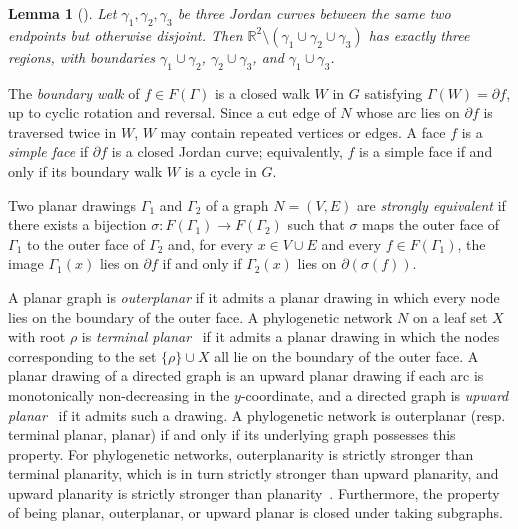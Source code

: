 \documentclass[pdflatex,sn-mathphys-num]{sn-jnl}
\theoremstyle{thmstyleone}%
\theoremstyle{thmstyletwo}%
\newtheorem{lemma}{Lemma}
\theoremstyle{thmstylethree}%
\begin{document}
\begin{lemma}[{\cite[Lemma~4.1.2(i)]{Diestel}}]\label{lmm:diestel-412}
Let $\gamma_1, \gamma_2, \gamma_3$ be three Jordan curves between the same two endpoints but otherwise disjoint. Then $\mathbb{R}^2\setminus (\gamma_1\cup \gamma_2 \cup \gamma_3)$ has exactly three regions, with boundaries $\gamma_1\cup \gamma_2$, $\gamma_2\cup \gamma_3$, and $\gamma_1\cup \gamma_3$.
\end{lemma}

The \emph{boundary walk} of $f \in F(\Gamma)$ is a closed walk $W$ in $G$ satisfying $\Gamma(W) = \partial f$, up to cyclic rotation and reversal. Since a cut edge of $N$ whose arc lies on $\partial f$ is traversed twice in $W$, $W$ may contain repeated vertices or edges. A face $f$ is a \emph{simple face} if $\partial f$ is a closed Jordan curve; equivalently, $f$ is a simple face if and only if its boundary walk $W$ is a cycle in $G$.

Two planar drawings $\Gamma_1$ and $\Gamma_2$ of a graph $N=(V,E)$ are \emph{strongly equivalent} if there exists a bijection $\sigma:F(\Gamma_1)\to F(\Gamma_2)$ such that $\sigma$ maps the outer face
of $\Gamma_1$ to the outer face of $\Gamma_2$ and, for every $x\in V\cup E$ and every $f\in F(\Gamma_1)$, the image $\Gamma_1(x)$ lies on $\partial f$ if and only if $\Gamma_2(x)$ lies on $\partial(\sigma(f))$.


A planar graph is \emph{outerplanar} if it admits a planar drawing in which every node lies on the boundary of the outer face. A phylogenetic network $N$ on a leaf set $X$ with root $\rho$ is \emph{terminal planar}~\cite{MoultonWu2022} if it admits a planar drawing in which the nodes corresponding to the set $\{\rho\} \cup X$ all lie on the boundary of the outer face. A planar drawing of a directed graph is an upward planar drawing if each arc is monotonically non-decreasing in the $y$-coordinate, and a directed graph is \emph{upward planar}~\cite{Thomassen1989} if it admits such a drawing. A phylogenetic network is outerplanar (resp. terminal planar, planar) if and only if its underlying graph possesses this property.
For phylogenetic networks, outerplanarity is strictly stronger than terminal planarity, which is in turn strictly stronger than upward planarity, and upward planarity is strictly stronger than planarity~\cite{MoultonWu2022}. Furthermore, the property of being planar, outerplanar, or upward planar is closed under taking subgraphs. 
\end{document}
